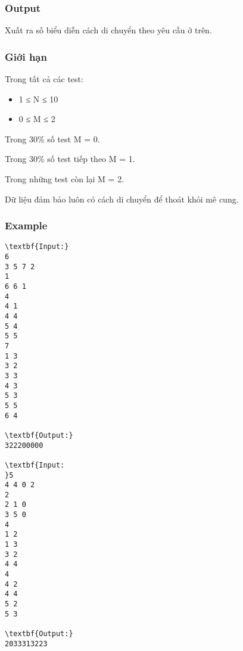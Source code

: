 \subsubsection{Output}

Xuất ra số biểu diễn cách di chuyển theo yêu cầu ở trên.

\subsubsection{Giới hạn}

Trong tất cả các test:
\begin{itemize}
	\item 1 ≤ N ≤ 10
	\item 0 ≤ M ≤ 2
\end{itemize}

Trong 30\% số test M = 0.

Trong 30\% số test tiếp theo M = 1.

Trong những test còn lại M = 2.

Dữ liệu đảm bảo luôn có cách di chuyển để thoát khỏi mê cung.

\subsubsection{Example}
\begin{verbatim}
\textbf{Input:}
6
3 5 7 2
1
6 6 1
4 
4 1
4 4
5 4
5 5
7
1 3
3 2
3 3
4 3
5 3
5 5
6 4

\textbf{Output:}
322200000
 
\textbf{Input:
}5
4 4 0 2
2
2 1 0
3 5 0
4
1 2
1 3
3 2
4 4
4
4 2
4 4
5 2
5 3

\textbf{Output:}
2033313223\end{verbatim}
